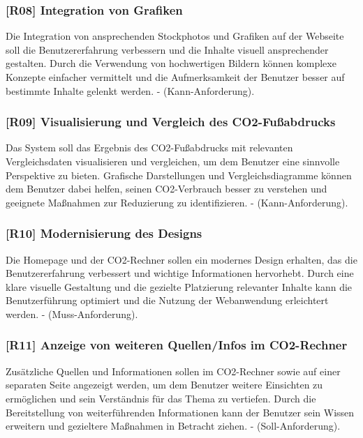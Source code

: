 \subsubsection{[R08] Integration von Grafiken}

Die Integration von ansprechenden Stockphotos und Grafiken auf der Webseite soll die Benutzererfahrung verbessern und die Inhalte visuell ansprechender gestalten. Durch die Verwendung von hochwertigen Bildern können komplexe Konzepte einfacher vermittelt und die Aufmerksamkeit der Benutzer besser auf bestimmte Inhalte gelenkt werden. - (Kann-Anforderung).

\subsubsection{[R09] Visualisierung und Vergleich des CO2-Fußabdrucks}

Das System soll das Ergebnis des CO2-Fußabdrucks mit relevanten Vergleichsdaten visualisieren und vergleichen, um dem Benutzer eine sinnvolle Perspektive zu bieten. Grafische Darstellungen und Vergleichsdiagramme können dem Benutzer dabei helfen, seinen CO2-Verbrauch besser zu verstehen und geeignete Maßnahmen zur Reduzierung zu identifizieren. - (Kann-Anforderung).

\subsubsection{[R10] Modernisierung des Designs}

Die Homepage und der CO2-Rechner sollen ein modernes Design erhalten, das die Benutzererfahrung verbessert und wichtige Informationen hervorhebt. Durch eine klare visuelle Gestaltung und die gezielte Platzierung relevanter Inhalte kann die Benutzerführung optimiert und die Nutzung der Webanwendung erleichtert werden. - (Muss-Anforderung).

\subsubsection{[R11] Anzeige von weiteren Quellen/Infos im CO2-Rechner}

Zusätzliche Quellen und Informationen sollen im CO2-Rechner sowie auf einer separaten Seite angezeigt werden, um dem Benutzer weitere Einsichten zu ermöglichen und sein Verständnis für das Thema zu vertiefen.
Durch die Bereitstellung von weiterführenden Informationen kann der Benutzer sein Wissen erweitern und gezieltere Maßnahmen in Betracht ziehen.
- (Soll-Anforderung).

